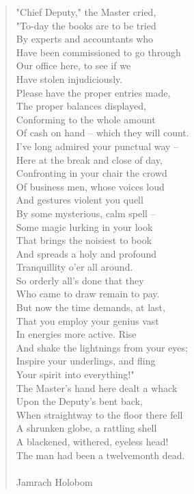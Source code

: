 \documentclass[11pt]{article}
\begin{document}
\begin{quote}   "Chief Deputy," the Master cried, \\
  "To-day the books are to be tried \\
  By experts and accountants who \\
  Have been commissioned to go through \\
  Our office here, to see if we \\
  Have stolen injudiciously. \\
  Please have the proper entries made, \\
  The proper balances displayed, \\
  Conforming to the whole amount \\
  Of cash on hand -- which they will count. \\
  I've long admired your punctual way -- \\
  Here at the break and close of day, \\
  Confronting in your chair the crowd \\
  Of business men, whose voices loud \\
  And gestures violent you quell \\
  By some mysterious, calm spell -- \\
  Some magic lurking in your look \\
  That brings the noisiest to book \\
  And spreads a holy and profound \\
  Tranquillity o'er all around. \\
  So orderly all's done that they \\
  Who came to draw remain to pay. \\
  But now the time demands, at last, \\
  That you employ your genius vast \\
  In energies more active.  Rise \\
  And shake the lightnings from your eyes; \\
  Inspire your underlings, and fling \\
  Your spirit into everything!" \\
  The Master's hand here dealt a whack \\
  Upon the Deputy's bent back, \\
  When straightway to the floor there fell \\
  A shrunken globe, a rattling shell \\
  A blackened, withered, eyeless head! \\
  The man had been a twelvemonth dead. \\
 \\
Jamrach Holobom \end{quote}
\end{document}
